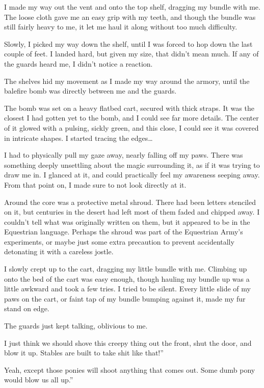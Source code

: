 I made my way out the vent and onto the top shelf, dragging my bundle with me. The loose cloth gave me an easy grip with my teeth, and though the bundle was still fairly heavy to me, it let me haul it along without too much difficulty.

Slowly, I picked my way down the shelf, until I was forced to hop down the last couple of feet. I landed hard, but given my size, that didn’t mean much. If any of the guards heard me, I didn’t notice a reaction.

The shelves hid my movement as I made my way around the armory, until the balefire bomb was directly between me and the guards.

The bomb was set on a heavy flatbed cart, secured with thick straps. It was the closest I had gotten yet to the bomb, and I could see far more details. The center of it glowed with a pulsing, sickly green, and this close, I could see it was covered in intricate shapes. I started tracing the edges…

I had to physically pull my gaze away, nearly falling off my paws. There was something deeply unsettling about the magic surrounding it, as if it was trying to draw me in. I glanced at it, and could practically feel my awareness seeping away. From that point on, I made sure to not look directly at it.

Around the core was a protective metal shroud. There had been letters stenciled on it, but centuries in the desert had left most of them faded and chipped away. I couldn’t tell what was originally written on them, but it appeared to be in the Equestrian language. Perhaps the shroud was part of the Equestrian Army’s experiments, or maybe just some extra precaution to prevent accidentally detonating it with a careless jostle.

I slowly crept up to the cart, dragging my little bundle with me. Climbing up onto the bed of the cart was easy enough, though hauling my bundle up was a little awkward and took a few tries. I tried to be silent. Every little slide of my paws on the cart, or faint tap of my bundle bumping against it, made my fur stand on edge.

The guards just kept talking, oblivious to me.

\leavevmode{}I just think we should shove this creepy thing out the front, shut the door, and blow it up. Stables are built to take shit like that!”

\leavevmode{}Yeah, except those ponies will shoot anything that comes out. Some dumb pony would blow us all up.”

